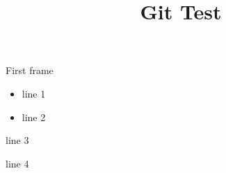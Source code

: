 \documentclass[10pt]{beamer}
\begin{document}
	
	\title{Git Test}
	\frame{\titlepage}
	

\begin{frame}{First frame}

\begin{minipage}{.5\textwidth}
	\begin{itemize}
		\item line 1
		\item line 2
	\end{itemize}
\end{minipage}
\begin{minipage}{.4\textwidth}
	line 3
	\begin{block}{}
		line 4
	\end{block}
\end{minipage}

\end{frame}
\end{document}

